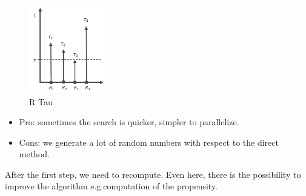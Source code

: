  \begin{figure}
    \centering
    \includegraphics[width=0.3\textwidth]{R_tau.png}
    \caption{R Tau}
    \label{fig:tau}
  \end{figure}

\begin{itemize}
\item Pro: sometimes the search is quicker, simpler to parallelize.
\item Cons: we generate a lot of random numbers with respect to the direct method.
\end{itemize}

After the first step, we need to recompute. Even here, there is the possibility to improve the algorithm e.g.computation of the propensity.


